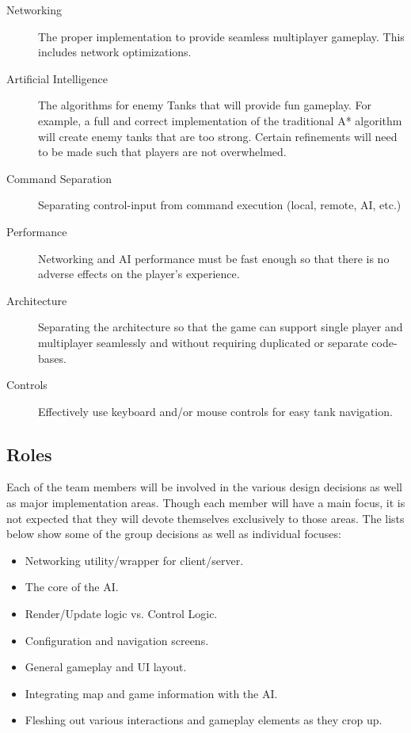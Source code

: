 \documentclass[letterpaper,11pt,twoside]{article}
\begin{document}
\begin{description}
 \item[Networking] The proper implementation to provide seamless multiplayer gameplay. This includes network optimizations.
 \item[Artificial Intelligence] The algorithms for enemy Tanks that will provide fun gameplay. For example, a full and correct implementation of the traditional A* algorithm will create enemy tanks that are too strong. Certain refinements will need to be made such that players are not overwhelmed.
 \item[Command Separation] Separating control-input from command execution (local, remote, AI, etc.)
 \item[Performance] Networking and AI performance must be fast enough so that there is no adverse effects on the player's experience.
 \item[Architecture] Separating the architecture so that the game can support single player and multiplayer seamlessly and without requiring duplicated or separate code-bases.
 \item[Controls] Effectively use keyboard and/or mouse controls for easy tank navigation.
\end{description}

\subsection{Roles}

Each of the team members will be involved in the various design decisions as well as major implementation areas. Though each member will have a main focus, it is not expected that they will devote themselves exclusively to those areas. The lists below show some of the group decisions as well as individual focuses:

\begin{itemize}
 \item Networking utility/wrapper for client/server.
 \item The core of the AI.
 \item Render/Update logic vs. Control Logic.
 \item Configuration and navigation screens.
 \item General gameplay and UI layout.
 \item Integrating map and game information with the AI.
 \item Fleshing out various interactions and gameplay elements as they crop up.
\end{itemize}
\end{document}
